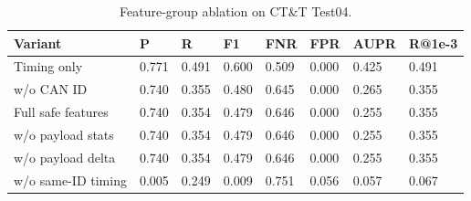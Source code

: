 \begin{table}[H]
\caption{Feature-group ablation on CT\&T Test04.}\label{tab:ablation}
\centering\small
\begin{tabular}{llllllll}
\hline
Variant & P & R & F1 & FNR & FPR & AUPR & R@1e-3 \\
\hline
Timing only & 0.771 & 0.491 & 0.600 & 0.509 & 0.000 & 0.425 & 0.491 \\
w/o CAN ID & 0.740 & 0.355 & 0.480 & 0.645 & 0.000 & 0.265 & 0.355 \\
Full safe features & 0.740 & 0.354 & 0.479 & 0.646 & 0.000 & 0.255 & 0.355 \\
w/o payload stats & 0.740 & 0.354 & 0.479 & 0.646 & 0.000 & 0.255 & 0.355 \\
w/o payload delta & 0.740 & 0.354 & 0.479 & 0.646 & 0.000 & 0.255 & 0.355 \\
w/o same-ID timing & 0.005 & 0.249 & 0.009 & 0.751 & 0.056 & 0.057 & 0.067 \\
\hline
\end{tabular}
\end{table}
